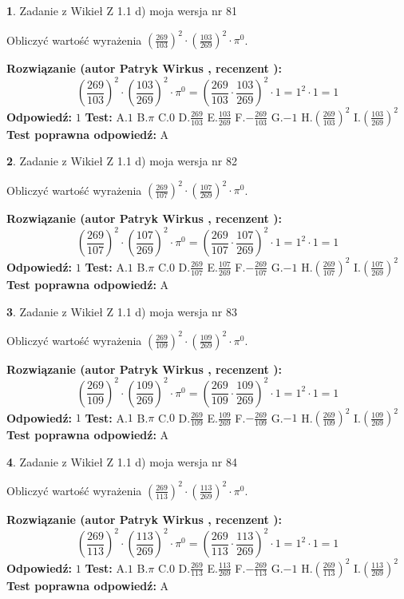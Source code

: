 \documentclass[12pt, a4paper]{article}
\theoremstyle{definition} %
\newtheorem{zad}{}
\newcommand{\zadStart}[1]{\begin{zad}#1\newline}
\newcommand{\zadStop}{\end{zad}}
\newcommand{\rozwStart}[2]{\noindent \textbf{Rozwiązanie (autor #1 , recenzent #2): }\newline}
\newcommand{\rozwStop}{\newline}
\newcommand{\odpStart}{\noindent \textbf{Odpowiedź:}\newline}
\newcommand{\odpStop}{\newline}
\newcommand{\testStart}{\noindent \textbf{Test:}\newline}
\newcommand{\testStop}{\newline}
\newcommand{\kluczStart}{\noindent \textbf{Test poprawna odpowiedź:}\newline}
\newcommand{\kluczStop}{\newline}
\begin{document}
\zadStart{Zadanie z Wikieł Z 1.1 d) moja wersja nr 81}

Obliczyć wartość wyrażenia $(\frac{269}{103})^{2} \cdot (\frac{103}{269})^{2} \cdot \pi^{0}$.
\zadStop
\rozwStart{Patryk Wirkus}{}
$$(\frac{269}{103})^{2} \cdot (\frac{103}{269})^{2} \cdot \pi^{0} = (\frac{269}{103} \cdot \frac{103}{269})^{2} \cdot 1 = 1^{2} \cdot 1 = 1$$
\rozwStop
\odpStart
$1$
\odpStop
\testStart
A.$1$ B.$\pi$ C.$0$ D.$\frac{269}{103}$ E.$\frac{103}{269}$
F.$-\frac{269}{103}$ G.$-1$
H.$(\frac{269}{103})^{2}$
I.$(\frac{103}{269})^{2}$
\testStop
\kluczStart
A
\kluczStop



\zadStart{Zadanie z Wikieł Z 1.1 d) moja wersja nr 82}

Obliczyć wartość wyrażenia $(\frac{269}{107})^{2} \cdot (\frac{107}{269})^{2} \cdot \pi^{0}$.
\zadStop
\rozwStart{Patryk Wirkus}{}
$$(\frac{269}{107})^{2} \cdot (\frac{107}{269})^{2} \cdot \pi^{0} = (\frac{269}{107} \cdot \frac{107}{269})^{2} \cdot 1 = 1^{2} \cdot 1 = 1$$
\rozwStop
\odpStart
$1$
\odpStop
\testStart
A.$1$ B.$\pi$ C.$0$ D.$\frac{269}{107}$ E.$\frac{107}{269}$
F.$-\frac{269}{107}$ G.$-1$
H.$(\frac{269}{107})^{2}$
I.$(\frac{107}{269})^{2}$
\testStop
\kluczStart
A
\kluczStop



\zadStart{Zadanie z Wikieł Z 1.1 d) moja wersja nr 83}

Obliczyć wartość wyrażenia $(\frac{269}{109})^{2} \cdot (\frac{109}{269})^{2} \cdot \pi^{0}$.
\zadStop
\rozwStart{Patryk Wirkus}{}
$$(\frac{269}{109})^{2} \cdot (\frac{109}{269})^{2} \cdot \pi^{0} = (\frac{269}{109} \cdot \frac{109}{269})^{2} \cdot 1 = 1^{2} \cdot 1 = 1$$
\rozwStop
\odpStart
$1$
\odpStop
\testStart
A.$1$ B.$\pi$ C.$0$ D.$\frac{269}{109}$ E.$\frac{109}{269}$
F.$-\frac{269}{109}$ G.$-1$
H.$(\frac{269}{109})^{2}$
I.$(\frac{109}{269})^{2}$
\testStop
\kluczStart
A
\kluczStop



\zadStart{Zadanie z Wikieł Z 1.1 d) moja wersja nr 84}

Obliczyć wartość wyrażenia $(\frac{269}{113})^{2} \cdot (\frac{113}{269})^{2} \cdot \pi^{0}$.
\zadStop
\rozwStart{Patryk Wirkus}{}
$$(\frac{269}{113})^{2} \cdot (\frac{113}{269})^{2} \cdot \pi^{0} = (\frac{269}{113} \cdot \frac{113}{269})^{2} \cdot 1 = 1^{2} \cdot 1 = 1$$
\rozwStop
\odpStart
$1$
\odpStop
\testStart
A.$1$ B.$\pi$ C.$0$ D.$\frac{269}{113}$ E.$\frac{113}{269}$
F.$-\frac{269}{113}$ G.$-1$
H.$(\frac{269}{113})^{2}$
I.$(\frac{113}{269})^{2}$
\testStop
\kluczStart
A
\kluczStop
\end{document}
